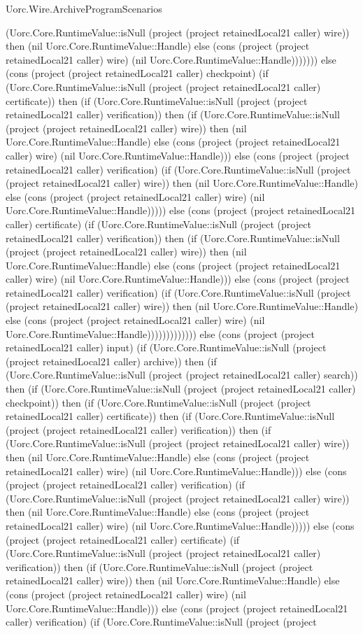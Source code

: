 \begin{lexlean}{Uorc.Wire.ArchiveProgramScenarios}
\begin{semanticmodule}
{(Uorc.Core.RuntimeValue::isNull (project (project retainedLocal21 caller) wire)) then (nil Uorc.Core.RuntimeValue::Handle) else (cons (project (project retainedLocal21 caller) wire) (nil Uorc.Core.RuntimeValue::Handle))))))) else (cons (project (project retainedLocal21 caller) checkpoint) (if (Uorc.Core.RuntimeValue::isNull (project (project retainedLocal21 caller) certificate)) then (if (Uorc.Core.RuntimeValue::isNull (project (project retainedLocal21 caller) verification)) then (if (Uorc.Core.RuntimeValue::isNull (project (project retainedLocal21 caller) wire)) then (nil Uorc.Core.RuntimeValue::Handle) else (cons (project (project retainedLocal21 caller) wire) (nil Uorc.Core.RuntimeValue::Handle))) else (cons (project (project retainedLocal21 caller) verification) (if (Uorc.Core.RuntimeValue::isNull (project (project retainedLocal21 caller) wire)) then (nil Uorc.Core.RuntimeValue::Handle) else (cons (project (project retainedLocal21 caller) wire) (nil Uorc.Core.RuntimeValue::Handle))))) else (cons (project (project retainedLocal21 caller) certificate) (if (Uorc.Core.RuntimeValue::isNull (project (project retainedLocal21 caller) verification)) then (if (Uorc.Core.RuntimeValue::isNull (project (project retainedLocal21 caller) wire)) then (nil Uorc.Core.RuntimeValue::Handle) else (cons (project (project retainedLocal21 caller) wire) (nil Uorc.Core.RuntimeValue::Handle))) else (cons (project (project retainedLocal21 caller) verification) (if (Uorc.Core.RuntimeValue::isNull (project (project retainedLocal21 caller) wire)) then (nil Uorc.Core.RuntimeValue::Handle) else (cons (project (project retainedLocal21 caller) wire) (nil Uorc.Core.RuntimeValue::Handle))))))))))))) else (cons (project (project retainedLocal21 caller) input) (if (Uorc.Core.RuntimeValue::isNull (project (project retainedLocal21 caller) archive)) then (if (Uorc.Core.RuntimeValue::isNull (project (project retainedLocal21 caller) search)) then (if (Uorc.Core.RuntimeValue::isNull (project (project retainedLocal21 caller) checkpoint)) then (if (Uorc.Core.RuntimeValue::isNull (project (project retainedLocal21 caller) certificate)) then (if (Uorc.Core.RuntimeValue::isNull (project (project retainedLocal21 caller) verification)) then (if (Uorc.Core.RuntimeValue::isNull (project (project retainedLocal21 caller) wire)) then (nil Uorc.Core.RuntimeValue::Handle) else (cons (project (project retainedLocal21 caller) wire) (nil Uorc.Core.RuntimeValue::Handle))) else (cons (project (project retainedLocal21 caller) verification) (if (Uorc.Core.RuntimeValue::isNull (project (project retainedLocal21 caller) wire)) then (nil Uorc.Core.RuntimeValue::Handle) else (cons (project (project retainedLocal21 caller) wire) (nil Uorc.Core.RuntimeValue::Handle))))) else (cons (project (project retainedLocal21 caller) certificate) (if (Uorc.Core.RuntimeValue::isNull (project (project retainedLocal21 caller) verification)) then (if (Uorc.Core.RuntimeValue::isNull (project (project retainedLocal21 caller) wire)) then (nil Uorc.Core.RuntimeValue::Handle) else (cons (project (project retainedLocal21 caller) wire) (nil Uorc.Core.RuntimeValue::Handle))) else (cons (project (project retainedLocal21 caller) verification) (if (Uorc.Core.RuntimeValue::isNull (project (project }
\end{semanticmodule}
\end{lexlean}
